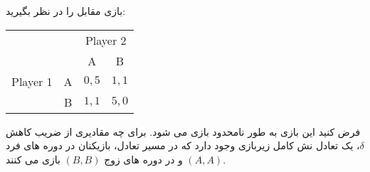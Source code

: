 بازی مقابل را در نظر بگیرید:

\LTR 
\begin{latin}
    \begin{center}
        \begin{tabular}{r  c | c | c |}
            \multicolumn{2}{r}{} &
            \multicolumn{2}{c}{Player 2} \\
            \multicolumn{1}{r}{} &
            \multicolumn{1}{c}{} &
            \multicolumn{1}{c}{A} &
            \multicolumn{1}{c}{B} \\ \cline{3-4}
            Player 1  & A       & $0,5$     & $1,1$  \\ \cline{3-4}
                      & B       & $1,1$     & $5,0$ \\ \cline{3-4}
        \end{tabular}
    \end{center}
\end{latin}
\RTL

فرض کنید این بازی به طور نامحدود بازی می شود. برای چه مقادیری از ضریب کاهش
$\delta$،
یک تعادل نش کامل زیربازی وجود دارد که در مسیر تعادل، بازیکنان در دوره های فرد 
$(A, A)$
و در دوره های زوج 
$(B, B)$
بازی می کنند.